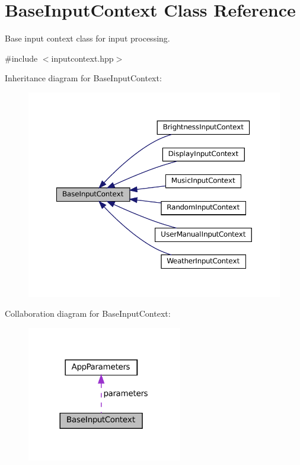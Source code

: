 \hypertarget{classBaseInputContext}{}\section{Base\+Input\+Context Class Reference}
\label{classBaseInputContext}


Base input context class for input processing.  




{\ttfamily \#include $<$inputcontext.\+hpp$>$}



Inheritance diagram for Base\+Input\+Context\+:\nopagebreak
\begin{figure}[H]
\begin{center}
\leavevmode
\includegraphics[width=350pt]{classBaseInputContext__inherit__graph}
\end{center}
\end{figure}


Collaboration diagram for Base\+Input\+Context\+:\nopagebreak
\begin{figure}[H]
\begin{center}
\leavevmode
\includegraphics[width=192pt]{classBaseInputContext__coll__graph}
\end{center}
\end{figure}
